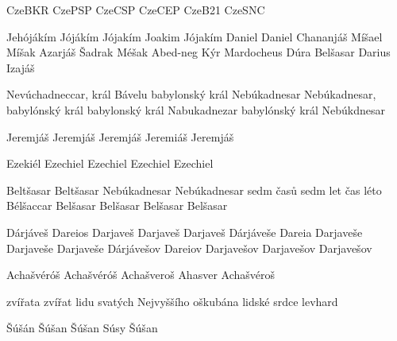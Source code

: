 
 {CzeBKR} {CzePSP} {CzeCSP} {CzeCEP} {CzeB21} {CzeSNC}

 {Jehójákím} {Jójákím} {Jójakím} {Joakim} {Jójakím}
 {} {Daniel} {Daniel} {} {}
 {} {} {Chananjáš} {} {}
 {} {} {Míšael} {} {}  %
 {} {} {Míšak} {} {}
 {} {} {Azarjáš} {} {}
 {} {} {Šadrak} {} {}
 {} {} {Méšak} {} {}
 {} {} {Abed-neg} {} {} %
 {} {} {Kýr} {} {}
 {} {} {Mardocheus} {} {}  %
 {} {} {Dúra} {} {} 
 {} {} {Belšasar} {} {}
 {} {} {Darius} {} {} %
 {} {} {Izajáš} {} {}

       {Nevúchadneccar, král Bávelu}
       {babylonský král Nebúkadnesar}
       {Nebúkadnesar, babylónský král}
       {babylonský král Nabukadnezar}                  
       {babylónský král Nebúkdnesar}                        

        {Jeremjáš} %
        {Jeremjáš} %
        {Jeremjáš} %
        {Jeremiáš} %
        {Jeremjáš} %

       {Ezekiél} %
       {Ezechiel} %
       {Ezechiel} %
       {Ezechiel} %
       {Ezechiel} %

       {}  {Beltšasar}    {Beltšasar}    {} {}
 {}  {Nebúkadnesar} {Nebúkadnesar} {} {}
       {}  {sedm časů}    {sedm let}     {} {}
           {}  {čas}          {léto}         {} {}
  {Bélšaccar} {Belšasar}   {Belšasar}  {Belšasar}  {Belšasar}

  {Dárjáveš}   {Dareios} {Darjaveš}   {Darjaveš}   {Darjaveš}
   {Dárjáveše}  {Dareia}  {Darjaveše}  {Darjaveše}  {Darjaveše}
  {Dárjávešov} {Dareiov} {Darjavešov} {Darjavešov} {Darjavešov}

 {Achašvéróš} {Achašvéróš} {Achašveroš} {Ahasver} {Achašvéroš}

 {} {} {zvířata} {} {} %
  {} {} {zvířat}  {} {} %
  {} {} {lidu svatých Nejvyššího}  {} {} %
  {} {} {oškubána}  {} {} %
  {} {} {lidské srdce}  {} {} %
  {} {} {levhard}  {} {}

 {Šúšán} {Šúšan} {Šúšan} {Súsy} {Šúšan} %

